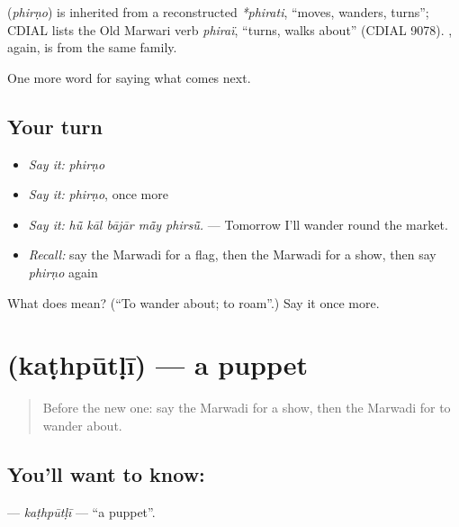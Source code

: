 \begin{cousinweb}
\textbf{} (\emph{phirṇo}) is inherited from a reconstructed \emph{*phirati}, \textquotedblleft{}moves, wanders, turns\textquotedblright{}; CDIAL lists the Old Marwari verb \emph{phiraï}, \textquotedblleft{}turns, walks about\textquotedblright{} (CDIAL 9078). \textbf{}, again, is from the same family.
\end{cousinweb}

\begin{grammarlens}[title={What you've built}]
One more word for saying what comes next.
\end{grammarlens}

\subsection*{Your turn}
\begin{itemize}
\raggedright
  \item \emph{Say it:} \emph{phirṇo}
  \item \emph{Say it:} \emph{phirṇo}, once more
  \item \emph{Say it:} \emph{hū̃ kāl bājār mā̃y phirsū̃.} — Tomorrow I'll wander round the market.
  \item \emph{Recall:} say the Marwadi for a flag, then the Marwadi for a show, then say \emph{phirṇo} again
\end{itemize}

\begin{tcolorbox}[breakable,colback=teal!4,colframe=teal!35!black,title={Before you move on}]
What does  mean? (\textquotedblleft{}To wander about; to roam\textquotedblright{}.) Say it once more.
\end{tcolorbox}
\section[\texorpdfstring{\mw{कठपूतळी} (kaṭhpūtḷī)}{कठपूतळी (kaṭhpūtḷī)}]{ (kaṭhpūtḷī) — a puppet}

\label{lesson:MW-C224-kathputli}



\begin{quote}
Before the new one: say the Marwadi for a show, then the Marwadi for to wander about.
\end{quote}

\subsection*{You'll want to know: }
\textbf{} — \emph{kaṭhpūtḷī} — \textquotedblleft{}a puppet\textquotedblright{}.


